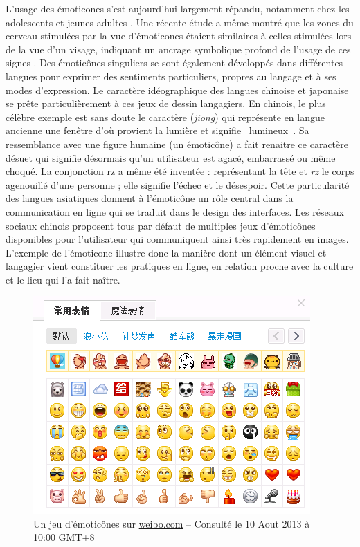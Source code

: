 L{\textquoteright}usage des émoticones s{\textquoteright}est aujourd{\textquoteright}hui largement répandu, notamment chez les adolescents et jeunes adultes \citep{Derks2007a}. Une récente étude a même montré que les zones du cerveau stimulées par la vue d{\textquoteright}émoticones étaient similaires à celles stimulées lors de la vue d{\textquoteright}un visage, indiquant un ancrage symbolique profond de l{\textquoteright}usage de ces signes \citep{Churches2014}. Des émoticônes singuliers se sont également développés dans différentes langues pour exprimer des sentiments particuliers, propres au langage et à ses modes d{\textquoteright}expression. Le caractère idéographique des langues chinoise et japonaise se prête particulièrement à ces jeux de dessin langagiers. En chinois, le plus célèbre exemple est sans doute le caractère  (\textit{jiong}) qui représente en langue ancienne une fenêtre d{\textquoteright}o\`u provient la lumière et signifie {\guillemotleft}~lumineux~{\guillemotright}. Sa ressemblance avec une figure humaine (un émoticône) a fait renaitre ce caractère désuet qui signifie désormais qu{\textquoteright}un utilisateur est agacé, embarrassé ou même choqué. La conjonction {\textquotedbl}rz{\textquotedbl} a même été inventée : représentant la tête et \textit{rz} le corps agenouillé d{\textquoteright}une personne ; elle signifie l{\textquoteright}échec et le désespoir. Cette particularité des langues asiatiques donnent à l{\textquoteright}émoticône un rôle central dans la communication en ligne qui se traduit dans le design des interfaces. Les réseaux sociaux chinois proposent tous par défaut de multiples jeux d{\textquoteright}émoticônes disponibles pour l{\textquoteright}utilisateur qui communiquent ainsi très rapidement en images.  L{\textquoteright}exemple de l{\textquoteright}émoticone illustre donc la manière dont un élément visuel et langagier vient constituer les pratiques en ligne, en relation proche avec la culture et le lieu qui l{\textquoteright}a fait na\^itre. 

\begin{figure}[htpb]
    \centering
    \includegraphics[width=4.1669in,height=3.278in]{figures/chap2/chapitre2-img1.png}
    \caption[Un jeu d{\textquoteright}émoticônes de Weibo]{Un jeu d{\textquoteright}émoticônes sur \url{weibo.com} -- Consulté le 10 Aout 2013 à 10:00 GMT+8}
    \label{fig:emoticons-weibo}
\end{figure}

